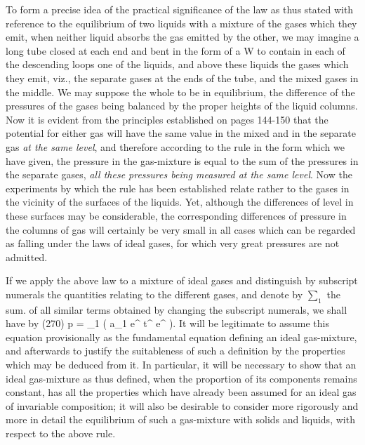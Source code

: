 \documentclass[12pt]{article}
\begin{document}
To form a precise idea of the practical significance of the law as thus stated with reference to the equilibrium of two liquids with a mixture of the gases which they emit, when neither liquid absorbs the gas emitted by the other, we may imagine a long tube closed at each end and bent in the form of a W to contain in each of the descending loops one of the liquids, and above these liquids the gases which they emit, viz., the separate gases at the ends of the tube, and the mixed gases in the middle. We may suppose the whole to be in equilibrium, the difference of the pressures of the gases being balanced by the proper heights of the liquid columns. Now it is evident from the principles established on pages 144-150 that the potential for either gas will have the same value in the mixed and in the separate gas \textit{at the same level}, and therefore according to the rule in the form which we have given, the pressure in the gas-mixture is equal to the sum of the pressures in the separate gases, \textit{all these pressures being measured at the same level}. Now the experiments by which the rule has been established relate rather to the gases in the vicinity of the surfaces of the liquids. Yet, although the differences of level in these surfaces may be considerable, the corresponding differences of pressure in the columns of gas will certainly be very small in all cases which can be regarded as falling under the laws of ideal gases, for which very great pressures are not admitted.


If we apply the above law to a mixture of ideal gases and distinguish by subscript numerals the quantities relating to the different gases, and denote by $\sum_1$ the sum. of all similar terms obtained by changing the subscript numerals, we shall have by (270)
\eqs p = \sum_1 \left( a_1 e^{} t^{} e^{} \right).  \label{273}\eqe
It will be legitimate to assume this equation provisionally as the fundamental equation defining an ideal gas-mixture, and afterwards to justify the suitableness of such a definition by the properties which may be deduced from it. In particular, it will be necessary to show that an ideal gas-mixture as thus defined, when the proportion of its components remains constant, has all the properties which have already been assumed for an ideal gas of invariable composition; it will also be desirable to consider more rigorously and more in detail the equilibrium of such a gas-mixture with solids and liquids, with respect to the above rule.
\end{document}
